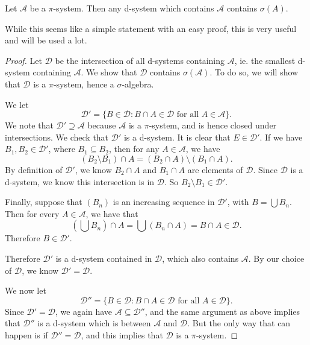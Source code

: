 \documentclass[a4paper]{article}
\begin{document}
\begin{lemma}
  Let $\mathcal{A}$ be a $\pi$-system. Then any d-system which contains $\mathcal{A}$ contains $\sigma(A)$.
\end{lemma}
While this seems like a simple statement with an easy proof, this is very useful and will be used a lot.

\begin{proof}
  Let $\mathcal{D}$ be the intersection of all d-systems containing $\mathcal{A}$, ie. the smallest d-system containing $\mathcal{A}$. We show that $\mathcal{D}$ contains $\sigma(\mathcal{A})$. To do so, we will show that $\mathcal{D}$ is a $\pi$-system, hence a $\sigma$-algebra.

  We let
  \[
    \mathcal{D}' = \{ B \in \mathcal{D}: B \cap A \in \mathcal{D}\text{ for all }A \in \mathcal{A}\}.
  \]
  We note that $\mathcal{D}' \supseteq \mathcal{A}$ because $\mathcal{A}$ is a $\pi$-system, and is hence closed under intersections. We check that $\mathcal{D}'$ is a d-system. It is clear that $E \in \mathcal{D}'$. If we have $B_1, B_2 \in \mathcal{D}'$, where $B_1 \subseteq B_2$, then for any $A \in \mathcal{A}$, we have
  \[
    (B_2 \setminus B_1) \cap A = (B_2 \cap A) \setminus (B_1 \cap A).
  \]
  By definition of $\mathcal{D}'$, we know $B_2 \cap A$ and $B_1 \cap A$ are elements of $\mathcal{D}$. Since $\mathcal{D}$ is a d-system, we know this intersection is in $\mathcal{D}$. So $B_2 \setminus B_1 \in \mathcal{D}'$.

  Finally, suppose that $(B_n)$ is an increasing sequence in $\mathcal{D}'$, with $B = \bigcup B_n$. Then for every $A \in \mathcal{A}$, we have that
  \[
    \left(\bigcup B_n\right) \cap A = \bigcup (B_n \cap A) = B \cap A \in \mathcal{D}.
  \]
  Therefore $B \in \mathcal{D}'$.

  Therefore $\mathcal{D}'$ is a d-system contained in $\mathcal{D}$, which also contains $\mathcal{A}$. By our choice of $\mathcal{D}$, we know $\mathcal{D}' = \mathcal{D}$.

  We now let
  \[
    \mathcal{D}'' = \{B \in \mathcal{D}: B \cap A \in \mathcal{D}\text{ for all }A \in \mathcal{D}\}.
  \]
  Since $\mathcal{D}' = \mathcal{D}$, we again have $\mathcal{A} \subseteq \mathcal{D}''$, and the same argument as above implies that $\mathcal{D}''$ is a d-system which is between $\mathcal{A}$ and $\mathcal{D}$. But the only way that can happen is if $\mathcal{D}'' = \mathcal{D}$, and this implies that $\mathcal{D}$ is a $\pi$-system.
\end{proof}
\end{document}
